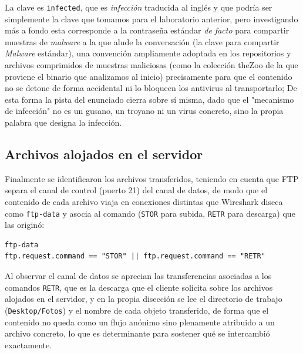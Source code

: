 \begin{respuesta}
  La clave es \texttt{infected}, que es \emph{infección} traducida al inglés y que podría ser simplemente la clave que tomamos para el laboratorio anterior, pero investigando más a fondo esta corresponde a la contraseña estándar \emph{de facto} para compartir muestras de \emph{malware} a la que alude la conversación (la clave para compartir \emph{Malware} estándar), una convención ampliamente adoptada en los repositorios y archivos comprimidos de muestras maliciosas (como la colección theZoo de la que proviene el binario que analizamos al inicio) precisamente para que el contenido no se detone de forma accidental ni lo bloqueen los antivirus al transportarlo; De esta forma la pista del enunciado cierra sobre sí misma, dado que el "mecanismo de infección" no es un gusano, un troyano ni un virus concreto, sino la propia palabra que designa la infección.
\end{respuesta}

\subsection{Archivos alojados en el servidor}

Finalmente se identificaron los archivos transferidos, teniendo en cuenta que FTP separa el canal de control (puerto 21) del canal de datos, de modo que el contenido de cada archivo viaja en conexiones distintas que Wireshark diseca como \texttt{ftp-data} y asocia al comando (\texttt{STOR} para subida, \texttt{RETR} para descarga) que las originó:

\begin{lstlisting}
ftp-data
ftp.request.command == "STOR" || ftp.request.command == "RETR"
\end{lstlisting}


\begin{analisis}
  Al observar el canal de datos se aprecian las transferencias asociadas a los comandos \texttt{RETR}, que es la descarga que el cliente solicita sobre los archivos alojados en el servidor, y en la propia disección se lee el directorio de trabajo (\texttt{Desktop/Fotos}) y el nombre de cada objeto transferido, de forma que el contenido no queda como un flujo anónimo sino plenamente atribuido a un archivo concreto, lo que es determinante para sostener qué se intercambió exactamente.
\end{analisis}

